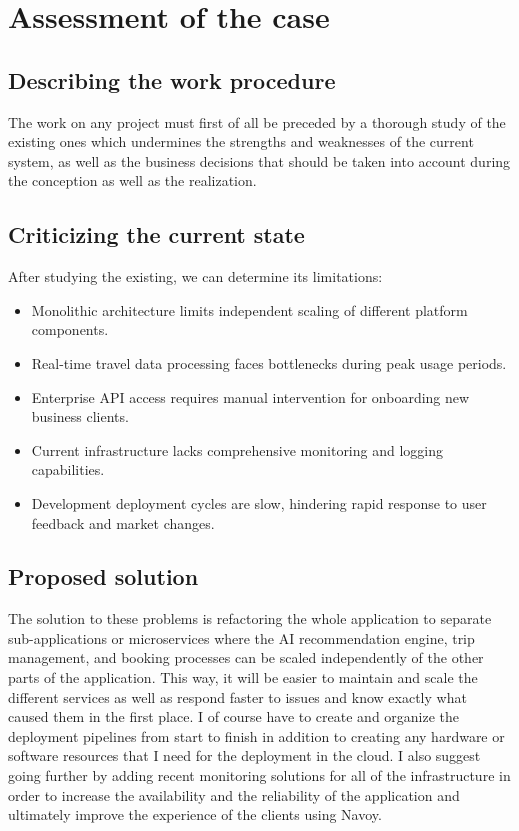 \section{Assessment of the case}
\subsection{Describing the work procedure}
The work on any project must first of all be preceded by a thorough study of the existing ones which undermines the strengths and weaknesses of the current system, as well as the business decisions that should be taken into account during the conception as well as the realization.
\subsection{Criticizing the current state}
After studying the existing, we can determine its limitations:
\begin{itemize}
  \item Monolithic architecture limits independent scaling of different platform components.
  \item Real-time travel data processing faces bottlenecks during peak usage periods.
  \item Enterprise API access requires manual intervention for onboarding new business clients.
  \item Current infrastructure lacks comprehensive monitoring and logging capabilities.
  \item Development deployment cycles are slow, hindering rapid response to user feedback and market changes.
\end{itemize}
\subsection{Proposed solution}
The solution to these problems is refactoring the whole application to separate sub-applications or microservices where the AI recommendation engine, trip management, and booking processes can be scaled independently of the other parts of the application.
This way, it will be easier to maintain and scale the different services as well as respond faster to issues and know exactly what caused them in the first place.
I of course have to create and organize the deployment pipelines from start to finish in addition to creating any hardware or software resources that I need for the deployment in the cloud.
I also suggest going further by adding recent monitoring solutions for all of the infrastructure in order to increase the availability and the reliability of the application and ultimately improve the experience of the clients using Navoy.

